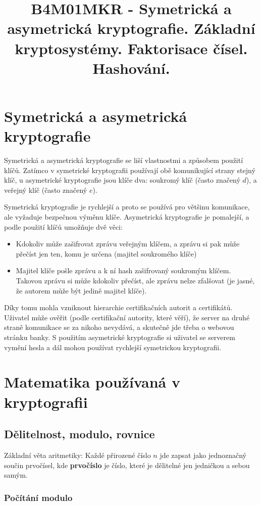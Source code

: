 \documentclass[10pt,a4paper]{article}
\title{B4M01MKR - Symetrická a asymetrická kryptografie. Základní kryptosystémy. Faktorisace čísel. Hashování.}
\date{}
\begin{document}
\maketitle
\section{Symetrická a asymetrická kryptografie}
Symetrická a asymetrická kryptografie se liší vlastnostmi a způsobem použití
klíčů. Zatímco v symetrické kryptografii používají obě komunikující strany
stejný klíč, u asymetrické kryptografie jsou klíče dva: soukromý klíč (často
značený $d$), a veřejný klíč (často značený $e$).

Symetrická kryptografie je rychlejší a proto se používá pro většinu komunikace,
ale vyžaduje bezpečnou výměnu klíče. Asymetrická kryptografie je pomalejší, a
podle použití klíčů umožňuje dvě věci:
\begin{itemize}
\item Kdokoliv může zašifrovat zprávu veřejným klíčem, a zprávu si pak může
přečíst jen ten, komu je určena (majitel soukromého klíče)
\item Majitel klíče pošle zprávu a k ní hash zašifrovaný soukromým klíčem.
Takovou zprávu si může kdokoliv přečíst, ale zprávu nelze zfalšovat (je jasné,
že autorem může být jedině majitel klíče).
\end{itemize}

Díky tomu mohla vzniknout hierarchie certifikačních autorit a certifikátů.
Uživatel může ověřit (podle certifikační autority, které věří), že server na
druhé straně komunikace se za nikoho nevydává, a skutečně jde třeba o webovou
stránku banky. S použitím asymetrické kryptografie si uživatel se serverem
vymění hesla a dál mohou používat rychlejší symetrickou kryptografii.

\section{Matematika používaná v kryptografii}
\subsection{Dělitelnost, modulo, rovnice}

Základní věta aritmetiky: Každé přirozené číslo $n$ jde zapsat jako jednoznačný
součin prvočísel, kde \textbf{prvočíslo} je číslo, které je dělitelné jen
jedničkou a sebou samým.

\subsubsection{Počítání modulo}
\end{document}
